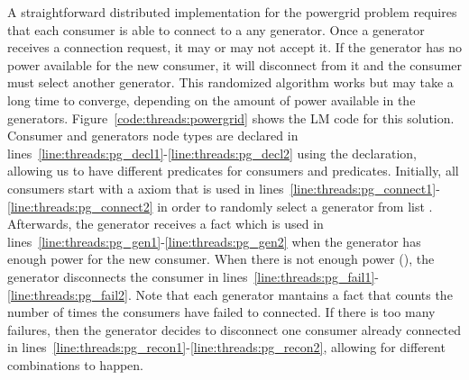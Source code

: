 A straightforward distributed implementation for the powergrid problem requires
that each consumer is able to connect to a any generator. Once a generator
receives a connection request, it may or may not accept it. If the generator has
no power available for the new consumer, it will disconnect from it and the
consumer must select another generator. This randomized algorithm works but may
take a long time to converge, depending on the amount of power available in the
generators. Figure~\ref{code:threads:powergrid} shows the LM code for this
solution. Consumer and generators node types are declared in
lines~\ref{line:threads:pg_decl1}-\ref{line:threads:pg_decl2} using the
 declaration, allowing us to have different predicates for consumers
and predicates. Initially, all consumers start with a  axiom
that is used in
lines~\ref{line:threads:pg_connect1}-\ref{line:threads:pg_connect2} in order to
randomly select a generator from list . Afterwards, the generator
receives a  fact which is used in
lines~\ref{line:threads:pg_gen1}-\ref{line:threads:pg_gen2} when the generator
has enough power for the new consumer. When there is not enough power
(), the generator disconnects the consumer in
lines~\ref{line:threads:pg_fail1}-\ref{line:threads:pg_fail2}. Note that each
generator mantains a  fact that counts the number of times the
consumers have failed to connected. If there is too many failures, then the
generator decides to disconnect one consumer already connected in
lines~\ref{line:threads:pg_recon1}-\ref{line:threads:pg_recon2}, allowing for
different combinations to happen.

